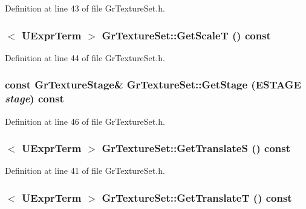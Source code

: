 Definition at line 43 of file GrTextureSet.h.\hypertarget{class_gr_texture_set_85e460bfad938d3898595f443ea81413}{
\subsubsection[{GetScaleT}]{$<$ {\bf UExprTerm} $>$ GrTextureSet::GetScaleT () const}}
\label{class_gr_texture_set_85e460bfad938d3898595f443ea81413}




Definition at line 44 of file GrTextureSet.h.\hypertarget{class_gr_texture_set_1b95d21a2eb9116e01ca3d41ddf31ff7}{
\subsubsection[{GetStage}]{\setlength{\rightskip}{0pt plus 5cm}const {\bf GrTextureStage}\& GrTextureSet::GetStage ({\bf ESTAGE} {\em stage}) const}}
\label{class_gr_texture_set_1b95d21a2eb9116e01ca3d41ddf31ff7}




Definition at line 46 of file GrTextureSet.h.\hypertarget{class_gr_texture_set_5bdc2fd3d5b35939ddfef2aa89543970}{
\subsubsection[{GetTranslateS}]{$<$ {\bf UExprTerm} $>$ GrTextureSet::GetTranslateS () const}}
\label{class_gr_texture_set_5bdc2fd3d5b35939ddfef2aa89543970}




Definition at line 41 of file GrTextureSet.h.\hypertarget{class_gr_texture_set_3d3c8845a947d560fe4244c3ab9908bb}{
\subsubsection[{GetTranslateT}]{$<$ {\bf UExprTerm} $>$ GrTextureSet::GetTranslateT () const}}
\label{class_gr_texture_set_3d3c8845a947d560fe4244c3ab9908bb}




